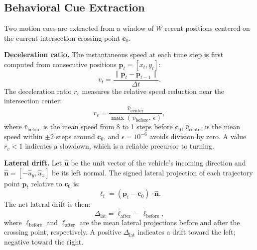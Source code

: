 \documentclass[conference]{IEEEtran}
\begin{document}
\subsection{Behavioral Cue Extraction}
\label{subsec:cues}

Two motion cues are extracted from a window of $W$ recent positions centered on the current intersection crossing point $\mathbf{c}_0$.

\textbf{Deceleration ratio.}
The instantaneous speed at each time step is first computed from consecutive positions $\mathbf{p}_t = [x_t, y_t]$:
\begin{equation}
  v_t = \frac{\|\mathbf{p}_t - \mathbf{p}_{t-1}\|}{\Delta t}.
\end{equation}
The deceleration ratio $r_v$ measures the relative speed reduction near the intersection center:
\begin{equation}
  r_v = \frac{\bar{v}_{\mathrm{center}}}{\max(\bar{v}_{\mathrm{before}},\, \epsilon)},
\end{equation}
where $\bar{v}_{\mathrm{before}}$ is the mean speed from 8 to 1 steps before $\mathbf{c}_0$, $\bar{v}_{\mathrm{center}}$ is the mean speed within $\pm 2$ steps around $\mathbf{c}_0$, and $\epsilon = 10^{-6}$ avoids division by zero.
A value $r_v < 1$ indicates a slowdown, which is a reliable precursor to turning.

\textbf{Lateral drift.}
Let $\hat{\mathbf{u}}$ be the unit vector of the vehicle's incoming direction and $\hat{\mathbf{n}} = [-\hat{u}_y, \hat{u}_x]$ be its left normal.
The signed lateral projection of each trajectory point $\mathbf{p}_t$ relative to $\mathbf{c}_0$ is:
\begin{equation}
  \ell_t = (\mathbf{p}_t - \mathbf{c}_0) \cdot \hat{\mathbf{n}}.
\end{equation}
The net lateral drift is then:
\begin{equation}
  \Delta_{\mathrm{lat}} = \bar{\ell}_{\mathrm{after}} - \bar{\ell}_{\mathrm{before}},
\end{equation}
where $\bar{\ell}_{\mathrm{before}}$ and $\bar{\ell}_{\mathrm{after}}$ are the mean lateral projections before and after the crossing point, respectively.
A positive $\Delta_{\mathrm{lat}}$ indicates a drift toward the left; negative toward the right.
\end{document}
